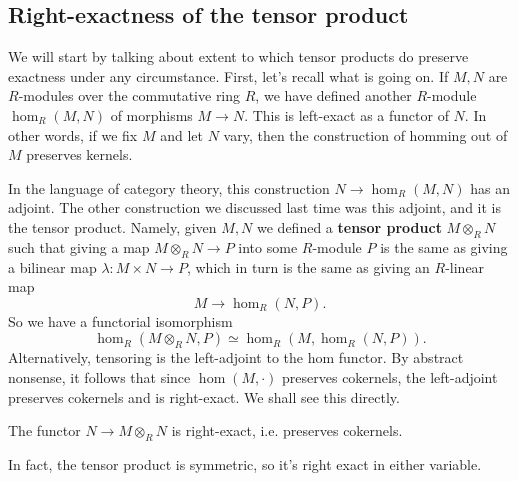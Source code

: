 \subsection{Right-exactness of the tensor product}

We will start by talking about extent to which tensor products do preserve
exactness under any circumstance.
First, let's recall what is going on. If $M,N$ are $R$-modules over the
commutative ring $R$, we have defined another $R$-module $\hom_R(M,N)$
of morphisms
$M \to N$. This is left-exact as a functor of $N$. In other words, if we fix
$M$ and let $N$ vary, then the construction of homming out of $M$ preserves
kernels.

In the language of category theory, this construction $N \to \hom_R(M,N)$ has
an adjoint. The other construction we discussed last time was this adjoint,
and it is  the tensor
product. Namely, given $M,N$ we defined a \textbf{tensor product} $M \otimes_R
N$ such that giving a map $M \otimes_R N \to P$ into some $R$-module $P$
is the same as giving a
bilinear map $\lambda: M \times N \to P$, which in turn is the same as giving
an $R$-linear map
\[ M \to \hom_R(N, P).	\]
So we have a functorial isomorphism
\[ \hom_R(M \otimes_R N, P) \simeq \hom_R(M, \hom_R(N,P)).  \]
Alternatively, tensoring is the left-adjoint to the
hom functor. By abstract nonsense, it follows that since $\hom(M, \cdot)$
preserves cokernels, the left-adjoint preserves cokernels and is right-exact.
We shall see this directly.

\begin{proposition}
The functor $N \to M \otimes_R N$ is right-exact, i.e. preserves cokernels.
\end{proposition}
In fact, the tensor product is symmetric, so it's right exact in either
variable.

